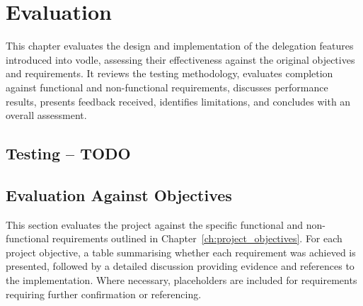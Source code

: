 \chapter{Evaluation}\label{ch:evaluation}

This chapter evaluates the design and implementation of the delegation features introduced into vodle, assessing their effectiveness against the original objectives and requirements. It reviews the testing methodology, evaluates completion against functional and non-functional requirements, discusses performance results, presents feedback received, identifies limitations, and concludes with an overall assessment.

\section{Testing -- TODO}



\section{Evaluation Against Objectives}

This section evaluates the project against the specific functional and non-functional requirements outlined in Chapter~\ref{ch:project_objectives}. For each project objective, a table summarising whether each requirement was achieved is presented, followed by a detailed discussion providing evidence and references to the implementation. Where necessary, placeholders are included for requirements requiring further confirmation or referencing.


